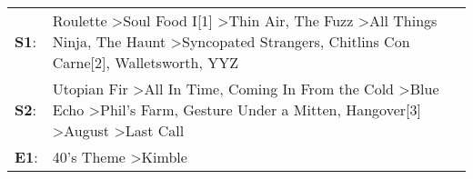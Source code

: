 \begin{supertabular}{p{0.03\textwidth}p{0.92\textwidth}}
 \textbf{S1}:  &  Roulette\textsuperscript{} \textgreater \enspace Soul Food I[1]\textsuperscript{} \textgreater \enspace Thin Air\textsuperscript{}, \enspace The Fuzz\textsuperscript{} \textgreater \enspace All Things Ninja\textsuperscript{}, \enspace The Haunt\textsuperscript{} \textgreater \enspace Syncopated Strangers\textsuperscript{}, \enspace Chitlins Con Carne[2]\textsuperscript{}, \enspace Walletsworth\textsuperscript{}, \enspace YYZ\textsuperscript{}  \enspace  \\
 \textbf{S2}:  &                         Utopian Fir\textsuperscript{} \textgreater \enspace All In Time\textsuperscript{}, \enspace Coming In From the Cold\textsuperscript{} \textgreater \enspace Blue Echo\textsuperscript{} \textgreater \enspace Phil's Farm\textsuperscript{}, \enspace Gesture Under a Mitten\textsuperscript{}, \enspace Hangover[3]\textsuperscript{} \textgreater \enspace August\textsuperscript{} \textgreater \enspace Last Call\textsuperscript{}  \enspace  \\
 \textbf{E1}:  &                                                                                                                                                                                                                                                                                                                                                                                     40's Theme\textsuperscript{} \textgreater \enspace Kimble\textsuperscript{}  \enspace  \\
\end{supertabular}
